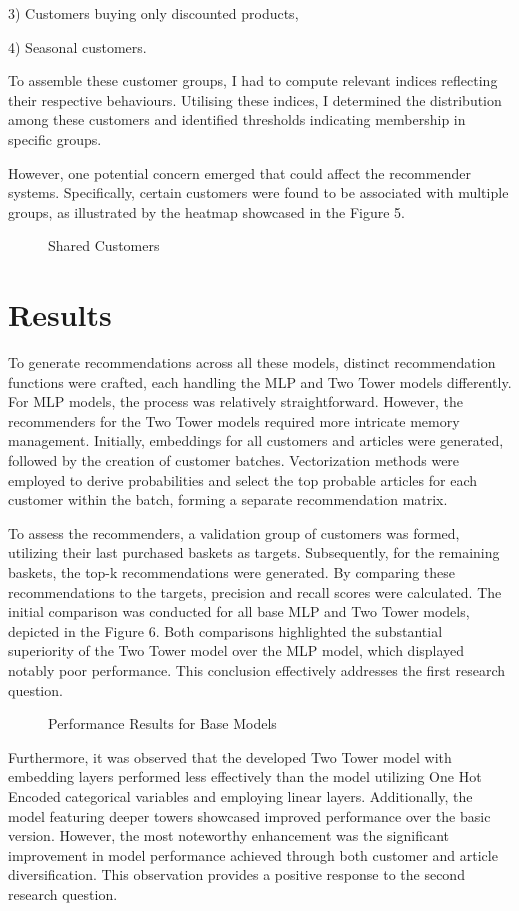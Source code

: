 \documentclass[conference,compsoc]{IEEEtran}
\begin{document}
3) Customers buying only discounted products,

4) Seasonal customers.

To assemble these customer groups, I had to compute relevant indices reflecting their respective behaviours. Utilising these indices, I determined the distribution among these customers and identified thresholds indicating membership in specific groups.

However, one potential concern emerged that could affect the recommender systems. Specifically, certain customers were found to be associated with multiple groups, as illustrated by the heatmap showcased in the Figure 5.
\begin{figure}[htbp]
    \centering
    \caption{Shared Customers}
    \label{fig:example}
\end{figure}

\section{Results}
To generate recommendations across all these models, distinct recommendation functions were crafted, each handling the MLP and Two Tower models differently. For MLP models, the process was relatively straightforward. However, the recommenders for the Two Tower models required more intricate memory management. Initially, embeddings for all customers and articles were generated, followed by the creation of customer batches. Vectorization methods were employed to derive probabilities and select the top probable articles for each customer within the batch, forming a separate recommendation matrix.

To assess the recommenders, a validation group of customers was formed, utilizing their last purchased baskets as targets. Subsequently, for the remaining baskets, the top-k recommendations were generated. By comparing these recommendations to the targets, precision and recall scores were calculated. The initial comparison was conducted for all base MLP and Two Tower models, depicted in the Figure 6. Both comparisons highlighted the substantial superiority of the Two Tower model over the MLP model, which displayed notably poor performance. This conclusion effectively addresses the first research question.
\begin{figure}[htbp]
    \centering
    \caption{Performance Results for Base Models}
    \label{fig:example}
\end{figure}
Furthermore, it was observed that the developed Two Tower model with embedding layers performed less effectively than the model utilizing One Hot Encoded categorical variables and employing linear layers. Additionally, the model featuring deeper towers showcased improved performance over the basic version. However, the most noteworthy enhancement was the significant improvement in model performance achieved through both customer and article diversification. This observation provides a positive response to the second research question.
\end{document}
